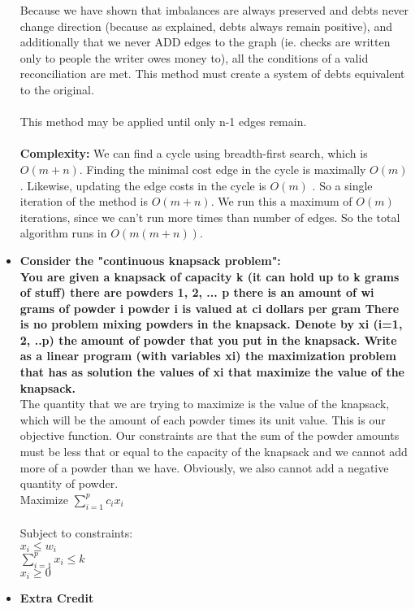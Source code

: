 \documentclass[a4paper]{article}
\begin{document}
\begin{itemize}
\begin{itemize}
\end{itemize}
Because we have shown that imbalances are always preserved and debts never change direction (because as explained, debts always remain positive), and additionally that we never ADD edges to the graph (ie. checks are written only to people the writer owes money to), all the conditions of a valid reconciliation are met. This method must create a system of debts equivalent to the original. \\
\\
This method may be applied until only n-1 edges remain. \\
\\
\textbf{Complexity:} We can find a cycle using breadth-first search, which is $O(m+n)$. Finding the minimal cost edge in the cycle is maximally $O(m)$. Likewise, updating the edge costs in the cycle is $O(m)$ . So a single iteration of the method is $O(m+n)$. We run this a maximum of $O(m)$ iterations, since we can't run more times than number of edges. So the total algorithm runs in $O(m(m+n))$. \\

\item{\textbf{Consider the "continuous knapsack problem": \\
You are given a knapsack of capacity k (it can hold up to k grams of stuff)
there are powders 1, 2, ... p
there is an amount of wi grams of powder i
powder i is valued at ci dollars per gram
There is no problem mixing powders in the knapsack. Denote by xi (i=1, 2, ..p) the amount of powder that you put in the knapsack.
Write as a linear program (with variables xi) the maximization problem that has as solution the values of xi that maximize the value of the knapsack.}} \\

The quantity that we are trying to maximize is the value of the knapsack, which will be the amount of each powder times its unit value. This is our objective function. Our constraints are that the sum of the powder amounts must be less that or equal to the capacity of the knapsack and we cannot add more of a powder than we have. Obviously, we also cannot add a negative quantity of powder.\\
Maximize $\sum_{i = 1}^p c_ix_i$ \\
\\
Subject to constraints:\\
$x_i \leq w_i$ \\
$\sum_{i=1}^p x_i \leq k$ \\
$x_i \geq 0$ \\

\item \textbf{Extra Credit}
\end{itemize}
\end{document}
